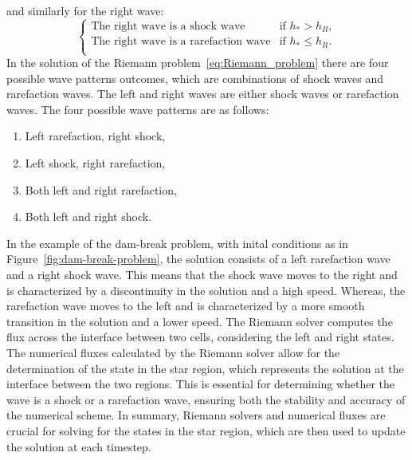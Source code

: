 and similarly for the right wave:
\begin{equation*}
    \begin{cases}
        \text{The right wave is a shock wave} & \text{if } h_* > h_R, \\
        \text{The right wave is a rarefaction wave} & \text{if } h_* \leq h_R. \\        
    \end{cases} 
\end{equation*}
In the solution of the Riemann problem~\eqref{eq:Riemann_problem} there are four possible wave patterns outcomes, which are combinations of shock waves and rarefaction waves.
The left and right waves are either shock waves or rarefaction waves.
The four possible wave patterns are as follows:
\begin{enumerate}[label=(\alph*)]
    \item Left rarefaction, right shock,
    \item Left shock, right rarefaction,
    \item Both left and right rarefaction,
    \item Both left and right shock.
\end{enumerate}
In the example of the dam-break problem, with inital conditions as in Figure~\ref{fig:dam-break-problem}, the solution consists of a left rarefaction wave and a right shock wave.
This means that the shock wave moves to the right and is characterized by a discontinuity in the solution and a high speed.
Whereas, the rarefaction wave moves to the left and is characterized by a more smooth transition in the solution and a lower speed.
The Riemann solver computes the flux across the interface between two cells, considering the left and right states.
The numerical fluxes calculated by the Riemann solver allow for the determination of the state in the star region, which represents the solution at the interface between the two regions.
This is essential for determining whether the wave is a shock or a rarefaction wave, ensuring both the stability and accuracy of the numerical scheme.
In summary, Riemann solvers and numerical fluxes are crucial for solving for the states in the star region, which are then used to update the solution at each timestep.

